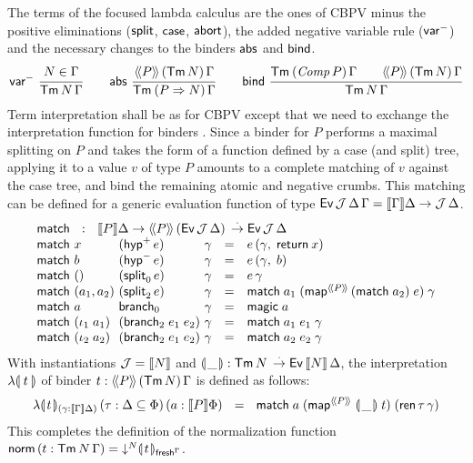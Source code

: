 \documentclass[sigplan,screen]{acmart}
\begin{document}
The terms  of the focused lambda calculus are the
ones of CBPV minus the positive eliminations ($\tsplit$, $\tcase$,
$\tabort$), the added negative variable rule ($\nvar$) and the
necessary changes to the binders $\tabs$ and $\tbind$.
\begin{gather*}
  \nru{\nvar}{N \in \Gamma}{\Tm N \Gamma}
\qquad
  \nru{\tabs}
      {\AddHypP P {\tTm\, N} \Gamma}
      {\TmP {P \To N} \Gamma}
\qquad
  \nru{\tbind}
      {\TmP {\Comp P} \Gamma \qquad \AddHypP P {\tTm\,N} \Gamma}
      {\Tm N \Gamma}
\end{gather*}
Term interpretation
shall be as for CBPV except that we need to exchange the
interpretation function for binders .  Since a binder
for $P$ performs a maximal splitting on $P$ and takes the form of a
function defined by a case (and split) tree,
applying it to a value $v$ of type $P$ amounts to a complete
matching of $v$ against the case tree, and bind the remaining
atomic and negative crumbs.  This matching can be defined for a
generic evaluation function of type
$\Evvv \J \Delta \Gamma = \den \Gamma \Delta \to \J\,\Delta$.
\[
\begin{array}{l@{~}l@{~}l@{~}lcl}
  \multicolumn 6 {l} {\tmatch ~~:~~ \den P \Delta \to
    \AddHypP P {\Evv \J \Delta} \todot \Evv \J \Delta }\\
  \tmatch & x & (\phyp\,e) & \gamma & = & e\,(\gamma,\; \treturn\,x) \\
  \tmatch & b & (\nhyp\,e) & \gamma & = & e\,(\gamma,\; b) \\
  \tmatch & \ttempty & (\nsplit\,e) & \gamma & = & e\,\gamma \\
  \tmatch & (a_1,a_2) & (\bsplit\,e) & \gamma & = &
    \tmatch\;a_1\;(\tmap[\Add P]\,(\tmatch\;a_2)\;e)\;\gamma \\
  \tmatch & a & \nbranch & \gamma & = & \tmagic\;a \\
  \tmatch & (\iota_1\;a_1) & (\bbranch\;e_1\;e_2) & \gamma & = &
    \tmatch\;a_1\;e_1\;\gamma \\
  \tmatch & (\iota_2\;a_2) & (\bbranch\;e_1\;e_2) & \gamma & = &
    \tmatch\;a_2\;e_2\;\gamma \\
\end{array}
\]
With instantiations $\J = \den N$ and
$\denty\_ : \Tm N \todot \Evv {\den N} \Delta$,
the interpretation $\fden t$
of binder $t : \AddHypP P {\tTm\,N} \Gamma$
is defined as follows:
\[
  \fdent{t}
    {(\gamma : \den \Gamma \Delta)}
    \, (\tau : \Delta \sublist \Phi)
    \, (a : \den P \Phi)
    ~~=~~
    \tmatch
      \; a
      \; (\tmap[\Add P]\;\denty\_\;t)
      \; (\tren\,\tau\,\gamma)
\]
This completes the definition of the normalization function
$\tnorm\, (t : \Tm N \Gamma)
  = \down N \dent t {\idenv\Gamma}$.
\end{document}

